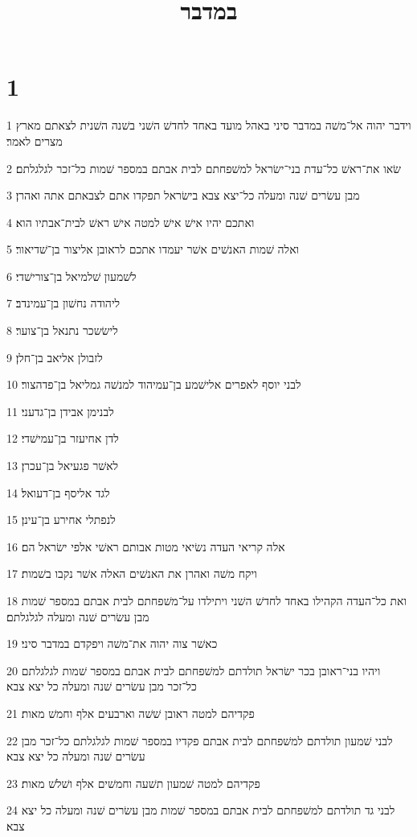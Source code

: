 

\title{במדבר}


\chapter{1}

\par 1 וידבר יהוה אל־משׁה במדבר סיני באהל מועד באחד לחדשׁ השׁני בשׁנה השׁנית לצאתם מארץ מצרים לאמר׃
\par 2 שׂאו את־ראשׁ כל־עדת בני־ישׂראל למשׁפחתם לבית אבתם במספר שׁמות כל־זכר לגלגלתם׃
\par 3 מבן עשׂרים שׁנה ומעלה כל־יצא צבא בישׂראל תפקדו אתם לצבאתם אתה ואהרן׃
\par 4 ואתכם יהיו אישׁ אישׁ למטה אישׁ ראשׁ לבית־אבתיו הוא׃
\par 5 ואלה שׁמות האנשׁים אשׁר יעמדו אתכם לראובן אליצור בן־שׁדיאור׃
\par 6 לשׁמעון שׁלמיאל בן־צורישׁדי׃
\par 7 ליהודה נחשׁון בן־עמינדב׃
\par 8 לישׂשכר נתנאל בן־צוער׃
\par 9 לזבולן אליאב בן־חלן׃
\par 10 לבני יוסף לאפרים אלישׁמע בן־עמיהוד למנשׁה גמליאל בן־פדהצור׃
\par 11 לבנימן אבידן בן־גדעני׃
\par 12 לדן אחיעזר בן־עמישׁדי׃
\par 13 לאשׁר פגעיאל בן־עכרן׃
\par 14 לגד אליסף בן־דעואל׃
\par 15 לנפתלי אחירע בן־עינן׃
\par 16 אלה קריאי העדה נשׂיאי מטות אבותם ראשׁי אלפי ישׂראל הם׃
\par 17 ויקח משׁה ואהרן את האנשׁים האלה אשׁר נקבו בשׁמות׃
\par 18 ואת כל־העדה הקהילו באחד לחדשׁ השׁני ויתילדו על־משׁפחתם לבית אבתם במספר שׁמות מבן עשׂרים שׁנה ומעלה לגלגלתם׃
\par 19 כאשׁר צוה יהוה את־משׁה ויפקדם במדבר סיני׃
\par 20 ויהיו בני־ראובן בכר ישׂראל תולדתם למשׁפחתם לבית אבתם במספר שׁמות לגלגלתם כל־זכר מבן עשׂרים שׁנה ומעלה כל יצא צבא׃
\par 21 פקדיהם למטה ראובן שׁשׁה וארבעים אלף וחמשׁ מאות׃
\par 22 לבני שׁמעון תולדתם למשׁפחתם לבית אבתם פקדיו במספר שׁמות לגלגלתם כל־זכר מבן עשׂרים שׁנה ומעלה כל יצא צבא׃
\par 23 פקדיהם למטה שׁמעון תשׁעה וחמשׁים אלף ושׁלשׁ מאות׃
\par 24 לבני גד תולדתם למשׁפחתם לבית אבתם במספר שׁמות מבן עשׂרים שׁנה ומעלה כל יצא צבא׃
